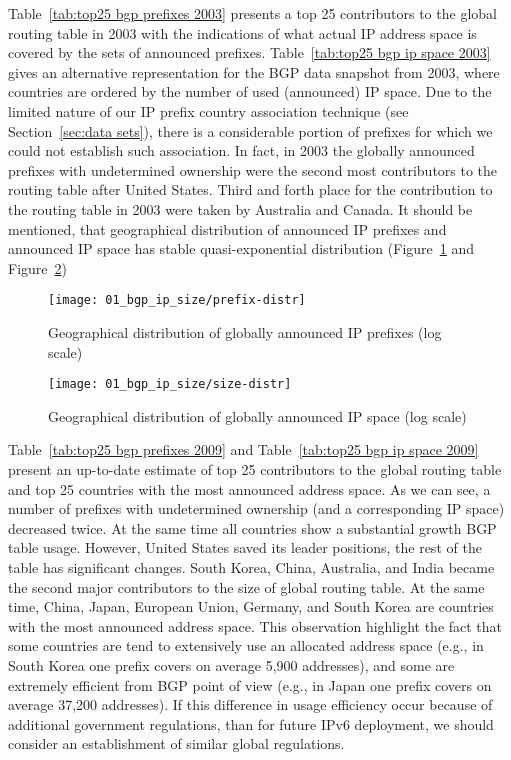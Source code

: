 Table~\ref{tab:top25 bgp prefixes 2003} presents a top 25 contributors to the
global routing table in 2003 with the indications of what actual IP address
space is covered by the sets of announced prefixes. Table~\ref{tab:top25 bgp
ip space 2003} gives an alternative representation for the BGP data snapshot
from 2003, where countries are ordered by the number of used (announced) IP
space. Due to the limited nature of our IP prefix country association
technique (see Section~\ref{sec:data sets}), there is a considerable portion
of prefixes for which we could not establish such association. In fact, in
2003 the globally announced prefixes with undetermined ownership were the
second most contributors to the routing table after United States. Third and
forth place for the contribution to the routing table in 2003 were taken by
Australia and Canada. It should be mentioned, that geographical distribution
of announced IP prefixes and announced IP space has stable quasi-exponential
distribution (Figure~\ref{fig:prefix distr} and Figure~\ref{fig:size distr})

\begin{figure}[htbp]
	\centering
		\texttt{[image: 01\_bgp\_ip\_size/prefix-distr]}
	\caption{Geographical distribution of globally announced IP prefixes (log scale)}
	\label{fig:prefix distr}
\end{figure}

\begin{figure}[htbp]
	\centering
		\texttt{[image: 01\_bgp\_ip\_size/size-distr]}
	\caption{Geographical distribution of globally announced IP space (log scale)}
	\label{fig:size distr}
\end{figure}

Table~\ref{tab:top25 bgp prefixes 2009} and Table~\ref{tab:top25 bgp ip space
2009} present an up-to-date estimate of top 25 contributors to the global
routing table and top 25 countries with the most announced address space. As
we can see, a number of prefixes with undetermined ownership (and a
corresponding IP space) decreased twice. At the same time all countries show a
substantial growth BGP table usage. However, United States saved its leader
positions, the rest of the table has significant changes. South Korea, China,
Australia, and India became the second major contributors to the size of
global routing table. At the same time, China, Japan, European Union, Germany,
and South Korea are countries with the most announced address space. This
observation highlight the fact that some countries are tend to extensively use
an allocated address space (e.g., in South Korea one prefix covers on average
5,900 addresses), and some are extremely efficient from BGP point of view
(e.g., in Japan one prefix covers on average 37,200 addresses). If this
difference in usage efficiency occur because of additional government
regulations, than for future IPv6 deployment, we should consider an
establishment of similar global regulations.

